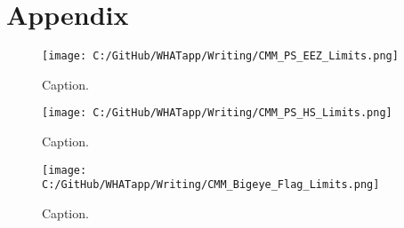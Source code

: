 \documentclass[11pt]{article}
\begin{document}
\section*{Appendix}





\newpage
 \begin{figure} [h]
  \centering
\texttt{[image: C:/GitHub/WHATapp/Writing/CMM\_PS\_EEZ\_Limits.png]}
  \caption {Caption.}
  \label{fig:CMM1}
\end{figure}


\newpage
 \begin{figure} [h]
  \centering
\texttt{[image: C:/GitHub/WHATapp/Writing/CMM\_PS\_HS\_Limits.png]}
  \caption {Caption.}
  \label{fig:CMM2}
\end{figure}


\newpage
 \begin{figure} [h]
  \centering
\texttt{[image: C:/GitHub/WHATapp/Writing/CMM\_Bigeye\_Flag\_Limits.png]}
  \caption {Caption.}
  \label{fig:CMM3}
\end{figure}
\end{document}
